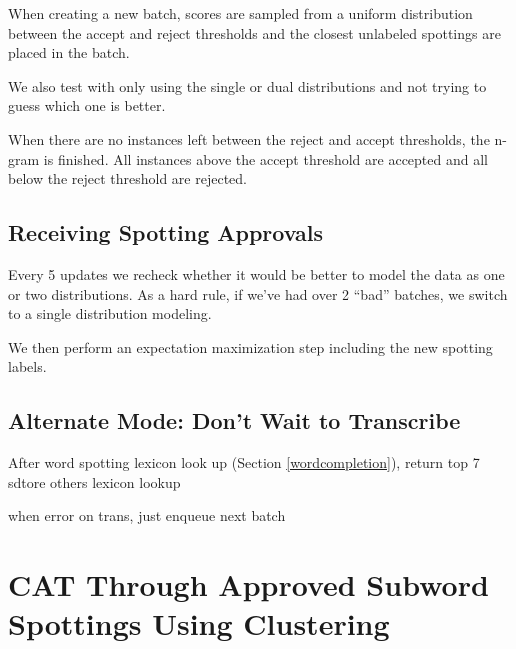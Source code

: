 \documentclass[ms,electronic,twosidetoc,letterpaper,chaptercenter,parttop,lol,lof,lot]{byumsphd}
\begin{document}
When creating a new batch, scores are sampled from a uniform distribution between the accept and reject thresholds and the closest unlabeled spottings are placed in the batch.

We also test with only using the single or dual distributions and not trying to guess which one is better.

When there are no instances left between the reject and accept thresholds, the n-gram is finished. All instances above the accept threshold are accepted and all below the reject threshold are rejected.

%
%

\subsection{Receiving Spotting Approvals}

Every 5 updates we recheck whether it would be better to model the data as one or two distributions.
As a hard rule, if we've had over 2 ``bad'' batches, we switch to a single distribution modeling.

We then perform an expectation maximization step including the new spotting labels.




\subsection{Alternate Mode: Don't Wait to Transcribe}
After word spotting lexicon look up (Section \ref{wordcompletion}), return top 7
sdtore others
lexicon lookup

when error on trans, just enqueue next batch




\section{CAT Through Approved Subword Spottings Using Clustering}
\end{document}
